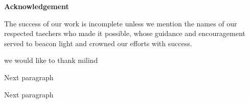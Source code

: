 \begin{center}
\begin{huge}
\bfseries{Acknowledgement}\\
\end{huge}
\end{center}
\vspace{1cm}
The success of our work is incomplete unless we mention the names of our respected taechers who made it possible, whose guidance and encouragement served to beacon light and crowned our efforts with success.

we would like to thank milind 

\noindent Next paragraph

\noindent Next paragraph